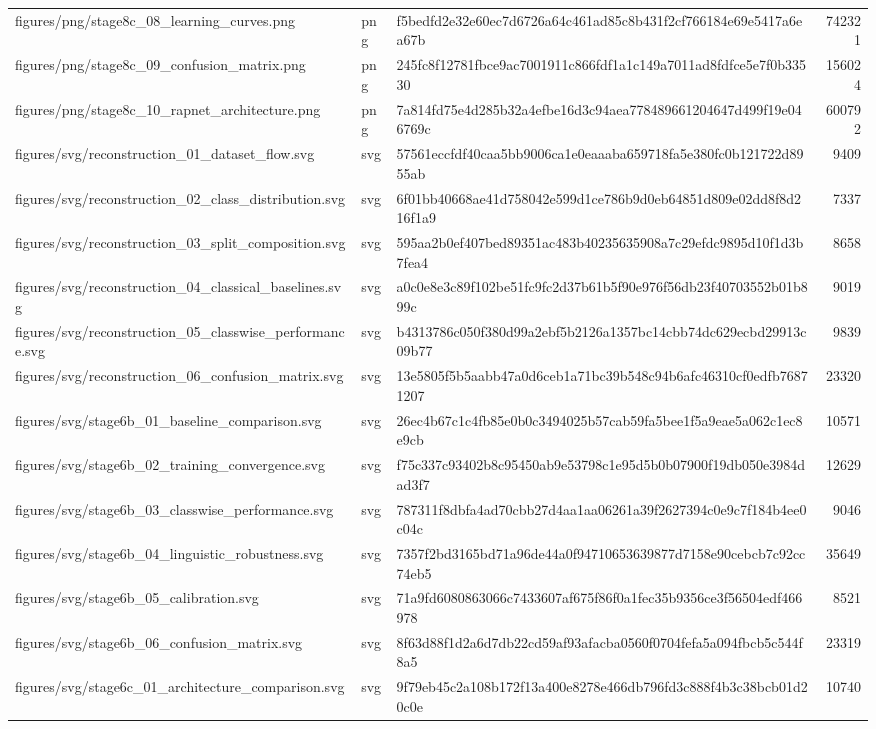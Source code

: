 \begin{tabular}{lllr}
figures/png/stage8c_08_learning_curves.png & png & f5bedfd2e32e60ec7d6726a64c461ad85c8b431f2cf766184e69e5417a6ea67b & 742321 \\
figures/png/stage8c_09_confusion_matrix.png & png & 245fc8f12781fbce9ac7001911c866fdf1a1c149a7011ad8fdfce5e7f0b33530 & 156024 \\
figures/png/stage8c_10_rapnet_architecture.png & png & 7a814fd75e4d285b32a4efbe16d3c94aea778489661204647d499f19e046769c & 600792 \\
figures/svg/reconstruction_01_dataset_flow.svg & svg & 57561eccfdf40caa5bb9006ca1e0eaaaba659718fa5e380fc0b121722d8955ab & 9409 \\
figures/svg/reconstruction_02_class_distribution.svg & svg & 6f01bb40668ae41d758042e599d1ce786b9d0eb64851d809e02dd8f8d216f1a9 & 7337 \\
figures/svg/reconstruction_03_split_composition.svg & svg & 595aa2b0ef407bed89351ac483b40235635908a7c29efdc9895d10f1d3b7fea4 & 8658 \\
figures/svg/reconstruction_04_classical_baselines.svg & svg & a0c0e8e3c89f102be51fc9fc2d37b61b5f90e976f56db23f40703552b01b899c & 9019 \\
figures/svg/reconstruction_05_classwise_performance.svg & svg & b4313786c050f380d99a2ebf5b2126a1357bc14cbb74dc629ecbd29913c09b77 & 9839 \\
figures/svg/reconstruction_06_confusion_matrix.svg & svg & 13e5805f5b5aabb47a0d6ceb1a71bc39b548c94b6afc46310cf0edfb76871207 & 23320 \\
figures/svg/stage6b_01_baseline_comparison.svg & svg & 26ec4b67c1c4fb85e0b0c3494025b57cab59fa5bee1f5a9eae5a062c1ec8e9cb & 10571 \\
figures/svg/stage6b_02_training_convergence.svg & svg & f75c337c93402b8c95450ab9e53798c1e95d5b0b07900f19db050e3984dad3f7 & 12629 \\
figures/svg/stage6b_03_classwise_performance.svg & svg & 787311f8dbfa4ad70cbb27d4aa1aa06261a39f2627394c0e9c7f184b4ee0c04c & 9046 \\
figures/svg/stage6b_04_linguistic_robustness.svg & svg & 7357f2bd3165bd71a96de44a0f94710653639877d7158e90cebcb7c92cc74eb5 & 35649 \\
figures/svg/stage6b_05_calibration.svg & svg & 71a9fd6080863066c7433607af675f86f0a1fec35b9356ce3f56504edf466978 & 8521 \\
figures/svg/stage6b_06_confusion_matrix.svg & svg & 8f63d88f1d2a6d7db22cd59af93afacba0560f0704fefa5a094fbcb5c544f8a5 & 23319 \\
figures/svg/stage6c_01_architecture_comparison.svg & svg & 9f79eb45c2a108b172f13a400e8278e466db796fd3c888f4b3c38bcb01d20c0e & 10740 \\

\end{tabular}
